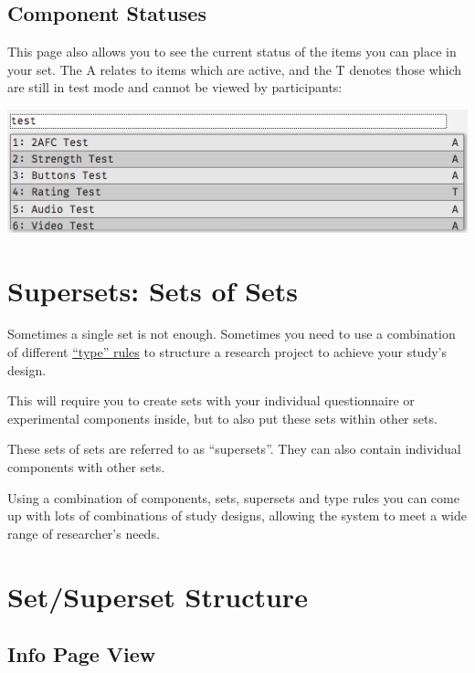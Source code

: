 \documentclass[]{book}
\begin{document}
\subsection{Component Statuses}\label{component-statuses}

This page also allows you to see the current status of the items you can
place in your set. The A relates to items which are active, and the T
denotes those which are still in test mode and cannot be viewed by
participants:

\includegraphics{images/screenshots/sets_8.png}

\hypertarget{supersets}{\section{Supersets: Sets of
Sets}\label{supersets}}

Sometimes a single set is not enough. Sometimes you need to use a
combination of different \protect\hyperlink{new_sets}{``type'' rules} to
structure a research project to achieve your study's design.

This will require you to create sets with your individual questionnaire
or experimental components inside, but to also put these sets within
other sets.

These sets of sets are referred to as ``supersets''. They can also
contain individual components with other sets.

Using a combination of components, sets, supersets and type rules you
can come up with lots of combinations of study designs, allowing the
system to meet a wide range of researcher's needs.

\section{Set/Superset Structure}\label{setsuperset-structure}

\hypertarget{info_page_structure}{\subsection{Info Page
View}\label{info_page_structure}}
\end{document}
